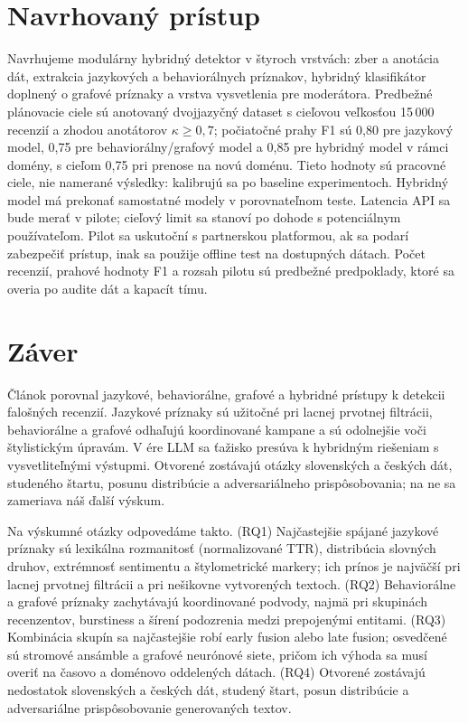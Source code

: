 \documentclass[10pt,twocolumn,twoside,slovak,a4paper]{article}
\begin{document}
\section{Navrhovaný prístup} \label{navrh}

Navrhujeme modulárny hybridný detektor v štyroch vrstvách: zber a anotácia dát, extrakcia jazykových a behaviorálnych príznakov, hybridný klasifikátor doplnený o grafové príznaky a vrstva vysvetlenia pre moderátora. Predbežné plánovacie ciele sú anotovaný dvojjazyčný dataset s cieľovou veľkosťou 15\,000 recenzií a zhodou anotátorov $\kappa \geq 0{,}7$; počiatočné prahy F1 sú 0,80 pre jazykový model, 0,75 pre behaviorálny/grafový model a 0,85 pre hybridný model v rámci domény, s cieľom 0,75 pri prenose na novú doménu. Tieto hodnoty sú pracovné ciele, nie namerané výsledky: kalibrujú sa po baseline experimentoch. Hybridný model má prekonať samostatné modely v porovnateľnom teste. Latencia API sa bude merať v pilote; cieľový limit sa stanoví po dohode s potenciálnym používateľom. Pilot sa uskutoční s partnerskou platformou, ak sa podarí zabezpečiť prístup, inak sa použije offline test na dostupných dátach. Počet recenzií, prahové hodnoty F1 a rozsah pilotu sú predbežné predpoklady, ktoré sa overia po audite dát a kapacít tímu.


\section{Záver} \label{zaver}

Článok porovnal jazykové, behaviorálne, grafové a hybridné prístupy k detekcii falošných recenzií. Jazykové príznaky sú užitočné pri lacnej prvotnej filtrácii, behaviorálne a grafové odhaľujú koordinované kampane a sú odolnejšie voči štylistickým úpravám. V ére LLM sa ťažisko presúva k hybridným riešeniam s vysvetliteľnými výstupmi. Otvorené zostávajú otázky slovenských a českých dát, studeného štartu, posunu distribúcie a adversariálneho prispôsobovania; na ne sa zameriava náš ďalší výskum.

Na výskumné otázky odpovedáme takto. (RQ1) Najčastejšie spájané jazykové príznaky sú lexikálna rozmanitosť (normalizované TTR), distribúcia slovných druhov, extrémnosť sentimentu a štylometrické markery; ich prínos je najväčší pri lacnej prvotnej filtrácii a pri nešikovne vytvorených textoch. (RQ2) Behaviorálne a grafové príznaky zachytávajú koordinované podvody, najmä pri skupinách recenzentov, burstiness a šírení podozrenia medzi prepojenými entitami. (RQ3) Kombinácia skupín sa najčastejšie robí early fusion alebo late fusion; osvedčené sú stromové ansámble a grafové neurónové siete, pričom ich výhoda sa musí overiť na časovo a doménovo oddelených dátach. (RQ4) Otvorené zostávajú nedostatok slovenských a českých dát, studený štart, posun distribúcie a adversariálne prispôsobovanie generovaných textov.


{\small


}
\end{document}
